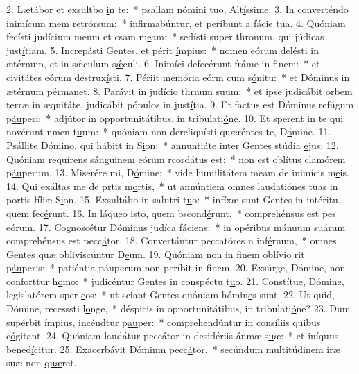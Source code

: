 2. Lætábor et exsultbo \uline{i}n te:~* psallam nómini tuo, Alt\uline{í}ssime.
3. In converténdo inimícum mem retr\uline{ó}rsum:~* infirmabúntur, et períbunt a fácie t\uline{u}a.
4. Quóniam fecísti judícium meum et csam m\uline{e}am:~* sedísti super thronum, qui júdicas just\uline{í}tiam.
5. Increpásti Gentes, et périt \uline{í}mpius:~* nomen eórum delésti in ætérnum, et in sǽculum s\uline{ǽ}culi.
6. Inimíci defecérunt fráme in f\uline{i}nem:~* et civitátes eórum destrux\uline{í}sti.
7. Périit memória eórm cum s\uline{ó}nitu:~* et Dóminus in ætérnum p\uline{é}rmanet.
8. Parávit in judício thrnum s\uline{u}um:~* et ipse judicábit orbem terræ in æquitáte, judicábit pópulos in just\uline{í}tia.
9. Et factus est Dóminus refúgum p\uline{áu}peri:~* adjútor in opportunitátibus, in tribulati\uline{ó}ne.
10. Et sperent in te qui novérunt nmen t\uline{u}um:~* quóniam non dereliquísti quæréntes te, D\uline{ó}mine.
11. Psállite Dómino, qui hábitt in S\uline{i}on:~* annuntiáte inter Gentes stúdia \uline{e}jus:
12. Quóniam requírens sánguinem eórum rcord\uline{á}tus est:~* non est oblítus clamórem p\uline{áu}perum.
13. Miserére mi, D\uline{ó}mine:~* vide humilitátem meam de inimícis m\uline{e}is.
14. Qui exáltas me de prtis m\uline{o}rtis,~* ut annúntiem omnes laudatiónes tuas in portis fíliæ S\uline{i}on.
15. Exsultábo in salutri t\uline{u}o:~* infíxæ sunt Gentes in intéritu, quem fec\uline{é}runt.
16. In láqueo isto, quem bscond\uline{é}runt,~* comprehénsus est pes e\uline{ó}rum.
17. Cognoscétur Dóminus judíca f\uline{á}ciens:~* in opéribus mánuum suárum comprehénsus est pecc\uline{á}tor.
18. Convertántur peccatóres n inf\uline{é}rnum,~* omnes Gentes quæ obliviscúntur D\uline{e}um.
19. Quóniam non in finem oblívio rit p\uline{áu}peris:~* patiéntia páuperum non períbit in f\uline{i}nem.
20. Exsúrge, Dómine, non conforttur h\uline{o}mo:~* judicéntur Gentes in conspéctu t\uline{u}o.
21. Constítue, Dómine, legislatórem sper \uline{e}os:~* ut sciant Gentes quóniam hómin\uline{e}s sunt.
22. Ut quid, Dómine, recesssti l\uline{o}nge,~* déspicis in opportunitátibus, in tribulati\uline{ó}ne?
23. Dum supérbit ímpius, incéndtur p\uline{au}per:~* comprehendúntur in consíliis quibus c\uline{ó}gitant.
24. Quóniam laudátur peccátor in desidériis ánmæ s\uline{u}æ:~* et iníquus bened\uline{í}citur.
25. Exacerbávit Dóminm pecc\uline{á}tor,~* secúndum multitúdinem iræ suæ non \uline{quæ}ret.
